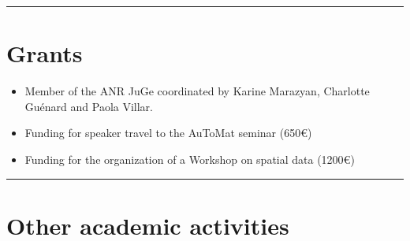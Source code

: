\documentclass[
]{article}
\begin{document}
\begin{center}\rule{0.5\linewidth}{0.5pt}\end{center}

\section{Grants}\label{grants}

\begin{itemize}
\item
  Member of the ANR JuGe coordinated by Karine Marazyan, Charlotte
  Guénard and Paola Villar.
\item
  Funding for speaker travel to the AuToMat seminar (650€)
\item
  Funding for the organization of a Workshop on spatial data (1200€)
\end{itemize}

\begin{center}\rule{0.5\linewidth}{0.5pt}\end{center}

\section{Other academic activities}\label{other-academic-activities}
\end{document}
